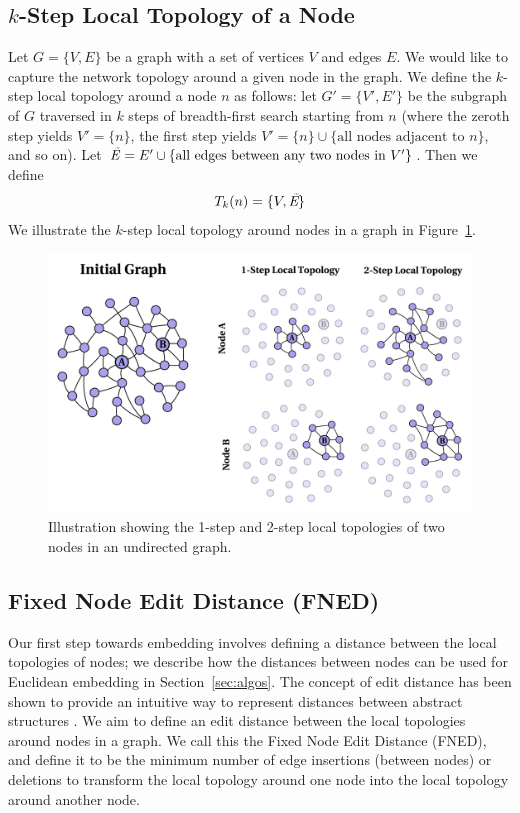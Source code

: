 \documentclass{article}
\begin{document}
\subsection{$k$-Step Local Topology of a Node}
Let $G = \{V,E\}$ be a graph with a set of vertices $V$ and edges $E$. We would like to capture the network topology around a given node in the graph. We define the $k$-step local topology around a node $n$ as follows: let $G' = \{ V',E' \}$ be the subgraph of $G$ traversed in $k$ steps of breadth-first search starting from $n$ (where the zeroth step yields $V' = \{ n \}$, the first step yields $V' = \{ n \} \cup \{ \text{all nodes adjacent to } n \} $, and so on). Let $ \text{\emph{\~{E}}} = E' \cup \{\text{all edges between any two nodes in } V' \}$. Then we define
\begin{equation}
T_{k}(n) = \{ V, \emph{\text{\~{E}}} \}
\end{equation}
We illustrate the $k$-step local topology around nodes in a graph in Figure~\ref{fig:localTopology}.
\begin{figure}[!]
  \centering               
  \includegraphics[width=1\textwidth]{../img/fnedRelated/localTopologyFigure.pdf}
  \caption{Illustration showing the 1-step and 2-step local topologies of two nodes in an undirected graph.}
  \label{fig:localTopology}
\end{figure}


\subsection{Fixed Node Edit Distance (FNED)}

Our first step towards embedding involves defining a distance between the local topologies of nodes; we describe how the distances between nodes can be used for Euclidean embedding in Section~\ref{sec:algos}. The concept of edit distance has been shown to provide an intuitive way to represent distances between abstract structures \cite{riesen2009approximate,reis2004automatic,gao2010survey}. We aim to define an edit distance between the local topologies around nodes in a graph. We call this the Fixed Node Edit Distance (FNED), and define it to be the minimum number of edge insertions (between nodes) or deletions to transform the local topology around one node into the local topology around another node.
\end{document}
